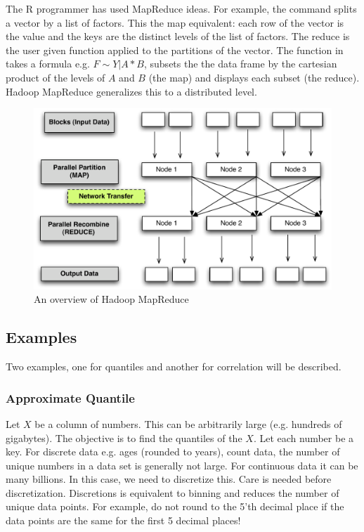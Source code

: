 \documentclass[letterpaper,10pt,english]{sphinxmanual}
\begin{document}
The R programmer has used MapReduce ideas. For example, the  command
splits a vector by a list of factors. This the map equivalent: each row of the
vector is the value and the keys are the distinct levels of the list of
factors. The reduce is the user given function applied to the partitions of the
vector. The  function in  takes a formula e.g. $F\sim
Y|A*B$, subsets the the data frame by the cartesian product of the levels of
$A$ and $B$ (the map) and displays each subset (the reduce). Hadoop
MapReduce generalizes this to a distributed level.
\begin{figure}[htbp]
\centering

\includegraphics{mapredslov.pdf}
\caption{An overview of Hadoop MapReduce}\end{figure}


\subsection{Examples}
\label{introduction:examples}
Two examples, one for quantiles and another for correlation will be described.


\subsubsection{Approximate Quantile}
\label{introduction:approximate-quantile}
Let $X$ be a column of numbers. This can be arbitrarily large
(e.g. hundreds of gigabytes). The objective is to find the quantiles of the
$X$. Let each number be a key. For discrete data e.g. ages (rounded to
years), count data, the number of unique numbers in a data set is generally not
large. For continuous data it can be many billions. In this case, we need to
discretize this. Care is needed before discretization. Discretions is equivalent
to binning and reduces the number of unique data points. For example, do not
round to the 5'th decimal place if the data points are the same for the first 5
decimal places!
\end{document}
